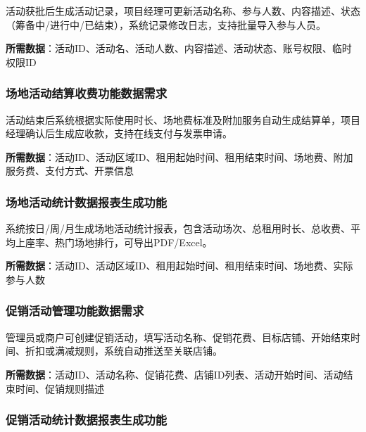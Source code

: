 \documentclass[]{article}
\begin{document}
活动获批后生成活动记录，项目经理可更新活动名称、参与人数、内容描述、状态（筹备中/进行中/已结束），系统记录修改日志，支持批量导入参与人员。

\textbf{所需数据}：活动ID、活动名、活动人数、内容描述、活动状态、账号权限、临时权限ID

\hypertarget{ux573aux5730ux6d3bux52a8ux7ed3ux7b97ux6536ux8d39ux529fux80fdux6570ux636eux9700ux6c42}{%
  \subsubsection{场地活动结算收费功能数据需求}\label{ux573aux5730ux6d3bux52a8ux7ed3ux7b97ux6536ux8d39ux529fux80fdux6570ux636eux9700ux6c42}}

活动结束后系统根据实际使用时长、场地费标准及附加服务自动生成结算单，项目经理确认后生成应收款，支持在线支付与发票申请。

\textbf{所需数据}：活动ID、活动区域ID、租用起始时间、租用结束时间、场地费、附加服务费、支付方式、开票信息

\hypertarget{ux573aux5730ux6d3bux52a8ux7edfux8ba1ux6570ux636eux62a5ux8868ux751fux6210ux529fux80fd}{%
  \subsubsection{场地活动统计数据报表生成功能}\label{ux573aux5730ux6d3bux52a8ux7edfux8ba1ux6570ux636eux62a5ux8868ux751fux6210ux529fux80fdux6570ux636eux9700ux6c42}}

系统按日/周/月生成场地活动统计报表，包含活动场次、总租用时长、总收费、平均上座率、热门场地排行，可导出PDF/Excel。

\textbf{所需数据}：活动ID、活动区域ID、租用起始时间、租用结束时间、场地费、实际参与人数

\hypertarget{ux4fc3ux9500ux6d3bux52a8ux7ba1ux7406ux529fux80fdux6570ux636eux9700ux6c42}{%
  \subsubsection{促销活动管理功能数据需求}\label{ux4fc3ux9500ux6d3bux52a8ux7ba1ux7406ux529fux80fdux6570ux636eux9700ux6c42}}

管理员或商户可创建促销活动，填写活动名称、促销花费、目标店铺、开始结束时间、折扣或满减规则，系统自动推送至关联店铺。

\textbf{所需数据}：活动ID、活动名称、促销花费、店铺ID列表、活动开始时间、活动结束时间、促销规则描述

\hypertarget{ux4fc3ux9500ux6d3bux52a8ux7edfux8ba1ux6570ux636eux62a5ux8868ux751fux6210ux529fux80fd}{%
  \subsubsection{促销活动统计数据报表生成功能}\label{ux4fc3ux9500ux6d3bux52a8ux7edfux8ba1ux6570ux636eux62a5ux8868ux751fux6210ux529fux80fdux6570ux636eux9700ux6c42}}
\end{document}
